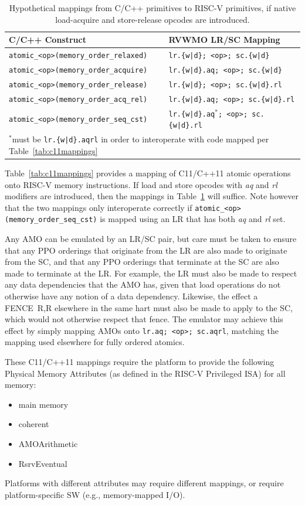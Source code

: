 \begin{table}[h!]
\begin{tabular}{|l|l|}
    \hline
    C/C++ Construct                           & RVWMO LR/SC Mapping\\
    \hline
    \tt atomic\_<op>(memory\_order\_relaxed)  & \tt lr.\{w|d\}; <op>; sc.\{w|d\} \\
    \hline
    \tt atomic\_<op>(memory\_order\_acquire)  & \tt lr.\{w|d\}.aq; <op>; sc.\{w|d\} \\
    \hline
    \tt atomic\_<op>(memory\_order\_release)  & \tt lr.\{w|d\}; <op>; sc.\{w|d\}.rl \\
    \hline
    \tt atomic\_<op>(memory\_order\_acq\_rel) & \tt lr.\{w|d\}.aq; <op>; sc.\{w|d\}.rl \\
    \hline
    \tt atomic\_<op>(memory\_order\_seq\_cst) & \tt lr.\{w|d\}.aq$^*$; <op>; sc.\{w|d\}.rl \\
    \hline
    \multicolumn{2}{l}{$^*$must be {\tt lr.\{w|d\}.aqrl} in order to interoperate with code mapped per Table~\ref{tab:c11mappings}}
  \end{tabular}
  \caption{Hypothetical mappings from C/C++ primitives to RISC-V primitives, if native load-acquire and store-release opcodes are introduced.}
  \label{tab:c11mappings_hypothetical}
\end{table}

Table~\ref{tab:c11mappings} provides a mapping of C11/C++11 atomic operations onto RISC-V memory instructions.
If load and store opcodes with {\em aq} and {\em rl} modifiers are introduced, then the mappings in Table~\ref{tab:c11mappings_hypothetical} will suffice.
Note however that the two mappings only interoperate correctly if {\tt atomic\_<op>(memory\_order\_seq\_cst)} is mapped using an LR that has both {\em aq} and {\em rl} set.

Any AMO can be emulated by an LR/SC pair, but care must be taken to ensure that any PPO orderings that originate from the LR are also made to originate from the SC, and that any PPO orderings that terminate at the SC are also made to terminate at the LR.
For example, the LR must also be made to respect any data dependencies that the AMO has, given that load operations do not otherwise have any notion of a data dependency.
Likewise, the effect a FENCE~R,R elsewhere in the same hart must also be made to apply to the SC, which would not otherwise respect that fence.
The emulator may achieve this effect by simply mapping AMOs onto {\tt lr.aq;~<op>;~sc.aqrl}, matching the mapping used elsewhere for fully ordered atomics.

These C11/C++11 mappings require the platform to provide the following Physical Memory Attributes (as defined in the RISC-V Privileged ISA) for all memory:
\begin{itemize}
  \item main memory
  \item coherent
  \item AMOArithmetic
  \item RsrvEventual
\end{itemize}
Platforms with different attributes may require different mappings, or require platform-specific SW (e.g., memory-mapped I/O).

